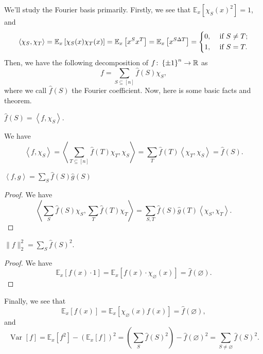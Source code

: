 We'll study the Fourier basis primarily. Firstly, we see that \(\mathbb{E}_{x}\left[\chi _S(x)^2 \right] = 1\), and
\[
	\left\langle \chi _S, \chi _T \right\rangle
	= \mathbb{E}_{x}\left[\chi _S(x) \chi _T(x) \right]
	= \mathbb{E}_{x}\left[x^S x^T \right]
	= \mathbb{E}_{x}\left[x^{S \Delta T} \right]
	= \begin{dcases}
		0, & \text{ if } S \neq T ; \\
		1, & \text{ if } S = T .
	\end{dcases}
\]
Then, we have the following decomposition of \(f\colon \left\{ \pm 1 \right\} ^n \to  \mathbb{\MakeUppercase{r}} \) as
\[
	f = \sum_{S \subseteq [n]} \hat{f} (S) \chi _S,
\]
where we call \(\hat{f} (S)\) the Fourier coefficient. Now, here is some basic facts and theorem.

\begin{remark}
	\(\hat{f} (S) = \left\langle f, \chi _S \right\rangle \).
\end{remark}
\begin{explanation}
	We have
	\[
		\left\langle f, \chi _S \right\rangle
		= \left\langle \sum_{T \subseteq [n]} \hat{f} (T) \chi _T, \chi _S \right\rangle
		= \sum_{T} \hat{f} (T) \left\langle \chi _T, \chi _S \right\rangle
		= \hat{f} (S).
	\]
\end{explanation}

\begin{theorem}\label{thm:Plancherel}
	\(\left\langle f, g \right\rangle = \sum_{S} \hat{f} (S) \hat{g} (S)\)
\end{theorem}
\begin{proof}
	We have
	\[
		\left\langle \sum_{S} \hat{f} (S) \chi _S, \sum_{T} \hat{f} (T) \chi _T \right\rangle
		= \sum_{S, T} \hat{f} (S) \hat{g} (T) \left\langle \chi _S, \chi _T  \right\rangle .
	\]
\end{proof}

\begin{theorem}\label{thm:Parseval}
	\(\lVert f \rVert _2^2 = \sum_{S} \hat{f} (S)^2\).
\end{theorem}
\begin{proof}
	We have
	\[
		\mathbb{E}_{x}\left[f(x) \cdot 1\right]
		= \mathbb{E}_{x}\left[f(x) \cdot \chi _\varnothing (x)\right]
		= \hat{f} (\varnothing ).
	\]
\end{proof}

Finally, we see that
\[
	\mathbb{E}_{x}\left[f(x) \right]
	= \mathbb{E}_{x}\left[\chi _\varnothing (x) f(x) \right]
	= \hat{f} (\varnothing ),
\]
and
\[
	\mathop{\mathrm{Var}}\nolimits_{}\left[f \right]
	= \mathbb{E}_{x}\left[f^2 \right] - \left( \mathbb{E}_{x}\left[f \right]  \right) ^2
	= \left( \sum_{S} \hat{f} (S)^2 \right) - \hat{f} (\varnothing )^2
	= \sum_{S \neq \varnothing } \hat{f} (S)^2.
\]

